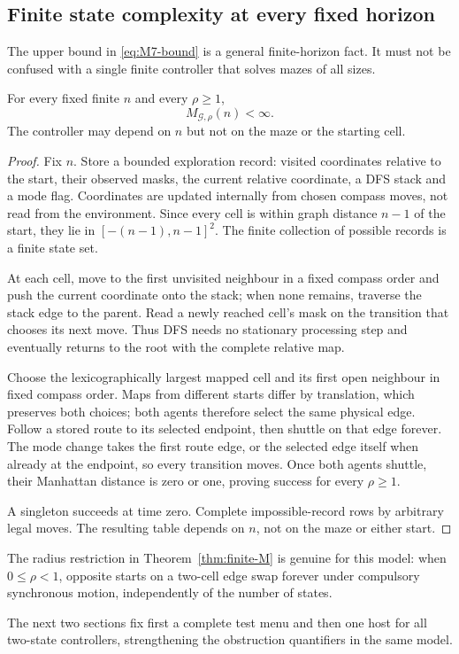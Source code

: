\subsection{Finite state complexity at every fixed horizon}

The upper bound in \eqref{eq:M7-bound} is a general finite-horizon fact.  It must not be confused with a single finite controller that solves mazes of all sizes.

\begin{theorem}\label{thm:finite-M}
For every fixed finite $n$ and every $\rho\ge1$,
\[
 \boxed{M_{\mathcal G,\rho}(n)<\infty.}
\]
The controller may depend on $n$ but not on the maze or the starting cell.
\end{theorem}
\begin{proof}
Fix $n$. Store a bounded exploration record: visited coordinates relative to the
start, their observed masks, the current relative coordinate, a DFS stack and a
mode flag. Coordinates are updated internally from chosen compass moves, not read
from the environment. Since every cell is within graph distance $n-1$ of the start,
they lie in $[-(n-1),n-1]^2$. The finite collection of possible records is a finite
state set.

At each cell, move to the first unvisited neighbour in a fixed compass order and
push the current coordinate onto the stack; when none remains, traverse the stack
edge to the parent. Read a newly reached cell's mask on the transition that chooses
its next move. Thus DFS needs no stationary processing step and eventually returns
to the root with the complete relative map.

Choose the lexicographically largest mapped cell and its first open neighbour in
fixed compass order. Maps from different starts differ by translation, which
preserves both choices; both agents therefore select the same physical edge.
Follow a stored route to its selected endpoint, then shuttle on that edge forever.
The mode change takes the first route edge, or the selected edge itself when already
at the endpoint, so every transition moves. Once both agents shuttle, their
Manhattan distance is zero or one, proving success for every $\rho\ge1$.

A singleton succeeds at time zero. Complete impossible-record rows by arbitrary
legal moves. The resulting table depends on $n$, not on the maze or either start.
\end{proof}

The radius restriction in Theorem~\ref{thm:finite-M} is genuine for this model: when $0\le\rho<1$, opposite starts on a two-cell edge swap forever under compulsory synchronous motion, independently of the number of states.

The next two sections fix first a complete test menu and then one host for all
two-state controllers, strengthening the obstruction quantifiers in the same model.
